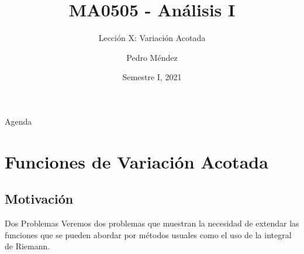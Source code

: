 \documentclass[utf8]{beamer}
\title[MA0505]{MA0505 - An\'alisis I}
\subtitle{Lecci\'on X: Variación Acotada}
\author{Pedro M\'endez\inst{1}}
\institute[Universidad de Costa Rica] %
{
  \inst{1}%
  Departmento de Matem\'atica Pura y Ciencias Actuariales\\
  Universidad de Costa Rica
  }
\date[I-2021] {Semestre I, 2021}
\theoremstyle{plain}
\theoremstyle{definition}
\theoremstyle{remark}
\numberwithin{equation}{section}
\renewcommand{\.}{\Cdot}                %
\begin{document}
\begin{frame}
  \titlepage
\end{frame}

\begin{frame}{Agenda}
  \tableofcontents
\end{frame}





\section{Funciones de Variación Acotada}

\subsection{Motivación}

\begin{frame}{Dos Problemas}
 Veremos dos problemas que muestran la necesidad de extendar las funciones que se pueden abordar por métodos usuales como el uso de la integral de Riemann.
\end{frame}
\end{document}
